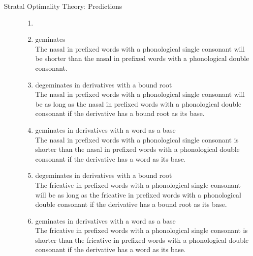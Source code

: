 \begin{description}\item[Stratal Optimality Theory: Predictions]
\begin{enumerate}[leftmargin=*]
	\item[]
	\item {} geminates \\
	The nasal in prefixed words with a phonological single consonant will be shorter than the nasal in  prefixed words with a phonological double consonant. 
		
	\item{} degeminates in derivatives with a bound root\\
	 The nasal in prefixed words with a phonological single consonant will be as long as the nasal in  prefixed words with a phonological double consonant if  the derivative has a bound root as its base.

	\item {} geminates in derivatives with a word as a base \\
	The nasal in prefixed words with a phonological single consonant is shorter than the nasal in prefixed words with a phonological double consonant if  the derivative has a word as its base.



	
	\item {} degeminates in derivatives with a bound root\\
	The fricative in prefixed words with a phonological single consonant will be as long as the fricative in prefixed words with a phonological double consonant if  the derivative has a bound root as its base.

	\item {} geminates in derivatives with a word as a base \\
	The fricative in prefixed words with a phonological single consonant is shorter than the fricative in prefixed words with a phonological double consonant if  the derivative has a word as its base.


\end{enumerate}
\end{description}
